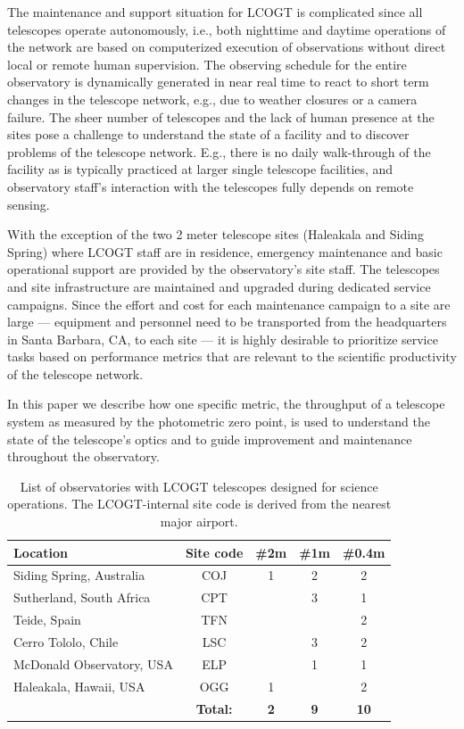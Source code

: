 \documentclass[]{spieman}
\begin{document}
The maintenance and support situation for LCOGT is complicated since all telescopes operate
autonomously, i.e., both nighttime and daytime operations of the network are based on computerized
execution of observations without direct local or remote human supervision. The observing schedule
for the entire observatory is dynamically generated in near real time to react to short term changes
in the telescope network\cite{saunders2014}, e.g., due to weather closures or a camera failure. The
sheer number of telescopes and the lack of human presence at the sites pose a challenge to
understand the state of a facility  and to discover problems of the telescope network. E.g., there
is no daily walk-through of the facility as is typically practiced at larger single telescope
facilities, and observatory staff's interaction with the telescopes fully depends on remote sensing.

With the exception of the two 2 meter telescope sites (Haleakala and Siding Spring) where LCOGT
staff are in residence, emergency maintenance and basic operational support are provided by the
observatory's site staff. The telescopes and site infrastructure are maintained and upgraded during
dedicated service campaigns. Since the effort and cost for each maintenance campaign to a site are
large --- equipment and personnel need to be transported from the headquarters in Santa Barbara, CA,
to each site --- it is highly desirable to prioritize service tasks based on performance metrics
that are relevant to the scientific productivity of the telescope network.


In this paper we describe how one specific metric, the throughput of a telescope system as measured
by the photometric zero point, is used to understand the state of the
telescope's optics and to guide improvement and maintenance throughout the observatory.


\begin{table}[h]
\centering
\begin{tabular} {|l|c|ccc|} \hline
Location                  & Site code & \#2m & \#1m & \#0.4m \\ \hline
Siding Spring, Australia & COJ & 1 & 2 & 2  \\
Sutherland, South Africa  & CPT &   & 3 & 1 \\
Teide, Spain              & TFN &   &   & 2 \\
Cerro Tololo, Chile       & LSC &   & 3 & 2 \\
McDonald Observatory, USA & ELP &   & 1 & 1\\
Haleakala, Hawaii, USA    & OGG & 1 &   & 2 \\\hline
                       &   \bf Total:  & \bf 2 & \bf 9 & \bf 10 \\ \hline
\end{tabular}
\vspace{1ex}
\caption{\label{tab_sites} List of observatories with LCOGT telescopes designed for science
operations. The LCOGT-internal site code is derived from the nearest major airport. }
\end{table}
\end{document}
